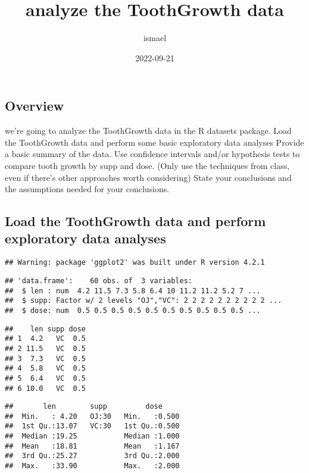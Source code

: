\documentclass[
]{article}
\title{analyze the ToothGrowth data}
\author{ismael}
\date{2022-09-21}
\begin{document}
\maketitle

\hypertarget{overview}{%
\subsection{Overview}\label{overview}}

we're going to analyze the ToothGrowth data in the R datasets package.
Load the ToothGrowth data and perform some basic exploratory data
analyses Provide a basic summary of the data. Use confidence intervals
and/or hypothesis tests to compare tooth growth by supp and dose. (Only
use the techniques from class, even if there's other approaches worth
considering) State your conclusions and the assumptions needed for your
conclusions.

\hypertarget{load-the-toothgrowth-data-and-perform-exploratory-data-analyses}{%
\subsection{Load the ToothGrowth data and perform exploratory data
analyses}\label{load-the-toothgrowth-data-and-perform-exploratory-data-analyses}}

\begin{verbatim}
## Warning: package 'ggplot2' was built under R version 4.2.1
\end{verbatim}

\begin{verbatim}
## 'data.frame':    60 obs. of  3 variables:
##  $ len : num  4.2 11.5 7.3 5.8 6.4 10 11.2 11.2 5.2 7 ...
##  $ supp: Factor w/ 2 levels "OJ","VC": 2 2 2 2 2 2 2 2 2 2 ...
##  $ dose: num  0.5 0.5 0.5 0.5 0.5 0.5 0.5 0.5 0.5 0.5 ...
\end{verbatim}

\begin{verbatim}
##    len supp dose
## 1  4.2   VC  0.5
## 2 11.5   VC  0.5
## 3  7.3   VC  0.5
## 4  5.8   VC  0.5
## 5  6.4   VC  0.5
## 6 10.0   VC  0.5
\end{verbatim}

\begin{verbatim}
##       len        supp         dose      
##  Min.   : 4.20   OJ:30   Min.   :0.500  
##  1st Qu.:13.07   VC:30   1st Qu.:0.500  
##  Median :19.25           Median :1.000  
##  Mean   :18.81           Mean   :1.167  
##  3rd Qu.:25.27           3rd Qu.:2.000  
##  Max.   :33.90           Max.   :2.000
\end{verbatim}
\end{document}
